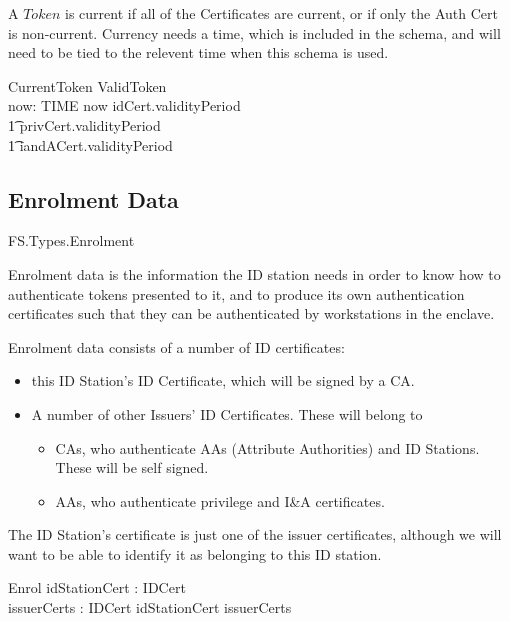 A $Token$ is current if all of the Certificates are current,
or if only the Auth Cert is non-current.
Currency needs a time, which is included in the schema,
and will need to be tied to the relevent time when this schema is used.

\begin{schema}{CurrentToken}
	ValidToken
\\	now: TIME
\where
	now \in idCert.validityPeriod
\\ \t1		{} \cap privCert.validityPeriod
\\ \t1		{} \cap iandACert.validityPeriod
\end{schema}

\subsection{Enrolment Data}

\begin{traceunit}{FS.Types.Enrolment}
\end{traceunit}
Enrolment data is the information the ID station needs in order to
know how to authenticate tokens presented to it, and to produce its
own authentication certificates such that they can be authenticated by
workstations in the enclave.

Enrolment data consists of a number of ID certificates: 
\begin{itemize}
\item
this ID Station's ID Certificate, which will be signed by a CA.
\item
A number of other Issuers' ID Certificates. These will belong to 
        \begin{itemize}
        \item
        CAs, who authenticate AAs (Attribute Authorities) and ID Stations. These will be self signed.
        \item
        AAs, who authenticate privilege and I\&A certificates. 
        \end{itemize}
\end{itemize}

The ID Station's certificate is just one of the issuer certificates,
although we will want to be able to identify it as belonging to this
ID station. 

\begin{schema}{Enrol}
        idStationCert : IDCert
\\      issuerCerts : \power IDCert
\where
        idStationCert \in issuerCerts
\end{schema}

